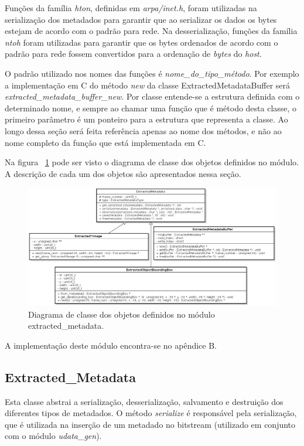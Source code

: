 Funções da família \textit{hton}, definidas em \textit{arpa/inet.h}, foram utilizadas na serialização dos metadados para garantir que ao serializar os dados os bytes estejam de acordo com o padrão para rede. Na desserialização, funções da família \textit{ntoh} foram utilizadas para garantir que os bytes ordenados de acordo com o padrão para rede fossem convertidos para a ordenação de \textit{bytes} do \textit{host}.

O padrão utilizado nos nomes das funções é \textit{nome\_do\_tipo\_método}. Por exemplo a implementação em C do método \textit{new} da classe ExtractedMetadataBuffer será \textit{extracted\_metadata\_buffer\_new}. Por classe entende-se a estrutura definida com o determinado nome, e sempre ao chamar uma função que é método desta classe, o primeiro parâmetro é um ponteiro para a estrutura que representa a classe. Ao longo dessa seção será feita referência apenas ao nome dos métodos, e não ao nome completo da função que está implementada em C.

Na figura ~\ref{fig:extracted_metadata_class_diagram} pode ser visto o diagrama de classe dos objetos definidos no módulo. A descrição de cada um dos objetos são apresentados nessa seção. 


\begin{figure}[H]
\centering
\includegraphics[scale=0.45]{imagens/fig10.eps}
\caption{Diagrama de classe dos objetos definidos no módulo extracted\_metadata.}
\label{fig:extracted_metadata_class_diagram}
\end{figure}

A implementação deste módulo encontra-se no apêndice B.


\subsection{ Extracted\_Metadata }

Esta classe abstrai a serialização, desserialização, salvamento e destruição dos diferentes tipos de metadados. O método \textit{serialize} é responsável pela serialização, que  é utilizada na inserção de um metadado no bitstream (utilizado em conjunto com o módulo \textit{udata\_gen}). 

